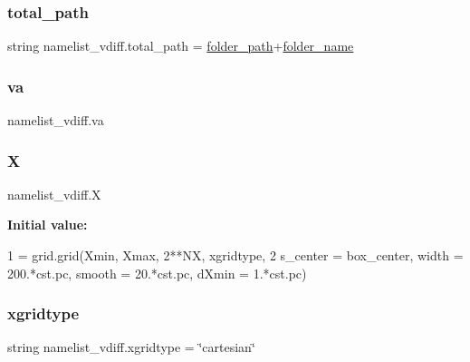 \subsubsection{\texorpdfstring{total\+\_\+path}{total\_path}}
{\footnotesize\ttfamily string namelist\+\_\+vdiff.\+total\+\_\+path = \hyperlink{namespacenamelist__vdiff_a71b64d0fbe9ace4295b1a38edf62f35f}{folder\+\_\+path}+\hyperlink{namespacenamelist__vdiff_a39763c29a287e42f404c27bcd47325ce}{folder\+\_\+name}}

\mbox{\label{namespacenamelist__vdiff_a2b4973b85c2a0c3258c564aee4b8cfc9}} 
\subsubsection{\texorpdfstring{va}{va}}
{\footnotesize\ttfamily namelist\+\_\+vdiff.\+va}

\mbox{\label{namespacenamelist__vdiff_afa73f83fa3158e9a3244396f6609c280}} 
\subsubsection{\texorpdfstring{X}{X}}
{\footnotesize\ttfamily namelist\+\_\+vdiff.\+X}

{\bfseries Initial value\+:}
\begin{DoxyCode}
1 =  grid.grid(Xmin, Xmax, 2**NX, xgridtype, 
2               s\_center = box\_center, width = 200.*cst.pc, smooth = 20.*cst.pc, dXmin = 1.*cst.pc)
\end{DoxyCode}
\mbox{\label{namespacenamelist__vdiff_a5fd5475a8aa194902c13a1f79b3ba050}} 
\subsubsection{\texorpdfstring{xgridtype}{xgridtype}}
{\footnotesize\ttfamily string namelist\+\_\+vdiff.\+xgridtype = \char`\"{}cartesian\char`\"{}}

\mbox{\label{namespacenamelist__vdiff_af625751fba71153bf0e5981fa439bba4}} 
